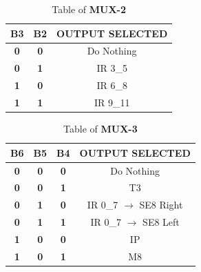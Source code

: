 \documentclass{article}
\begin{document}
\begin{table}[htb]
\centering
\begin{tabular}{|c|c|c|}
\hline
\rowcolor[HTML]{FFFC9E} 
\textbf{B3}                       & \textbf{B2}                       & \textbf{OUTPUT   SELECTED}        \\ \hline
{\color[HTML]{680100} \textbf{0}} & {\color[HTML]{680100} \textbf{0}} & {\color[HTML]{013300} Do Nothing} \\ \hline
{\color[HTML]{680100} \textbf{0}} & {\color[HTML]{680100} \textbf{1}} & {\color[HTML]{013300} IR 3\_5}    \\ \hline
{\color[HTML]{680100} \textbf{1}} & {\color[HTML]{680100} \textbf{0}} & {\color[HTML]{013300} IR 6\_8}    \\ \hline
{\color[HTML]{680100} \textbf{1}} & {\color[HTML]{680100} \textbf{1}} & {\color[HTML]{013300} IR 9\_11}   \\ \hline
\end{tabular}
\caption{Table of \textbf{MUX-2}}
\end{table}

\begin{table}[htb]
\centering
\begin{tabular}{|c|c|c|c|}
\hline
\rowcolor[HTML]{FFFC9E} 
\textbf{B6}                       & \textbf{B5}                       & \textbf{B4}                       & OUTPUT   SELECTED                           \\ \hline
{\color[HTML]{680100} \textbf{0}} & {\color[HTML]{680100} \textbf{0}} & {\color[HTML]{680100} \textbf{0}} & {\color[HTML]{013300} Do Nothing}           \\ \hline
{\color[HTML]{680100} \textbf{0}} & {\color[HTML]{680100} \textbf{0}} & {\color[HTML]{680100} \textbf{1}} & {\color[HTML]{013300} T3}                   \\ \hline
{\color[HTML]{680100} \textbf{0}} & {\color[HTML]{680100} \textbf{1}} & {\color[HTML]{680100} \textbf{0}} & {\color[HTML]{013300} IR 0\_7 $\rightarrow$   SE8 Right} \\ \hline
{\color[HTML]{680100} \textbf{0}} & {\color[HTML]{680100} \textbf{1}} & {\color[HTML]{680100} \textbf{1}} & {\color[HTML]{013300} IR 0\_7 $\rightarrow$   SE8 Left}  \\ \hline
{\color[HTML]{680100} \textbf{1}} & {\color[HTML]{680100} \textbf{0}} & {\color[HTML]{680100} \textbf{0}} & {\color[HTML]{013300} IP}                   \\ \hline
{\color[HTML]{680100} \textbf{1}} & {\color[HTML]{680100} \textbf{0}} & {\color[HTML]{680100} \textbf{1}} & {\color[HTML]{013300} M8}                   \\ \hline
\end{tabular}
\caption{Table of \textbf{MUX-3}}
\end{table}
\end{document}
